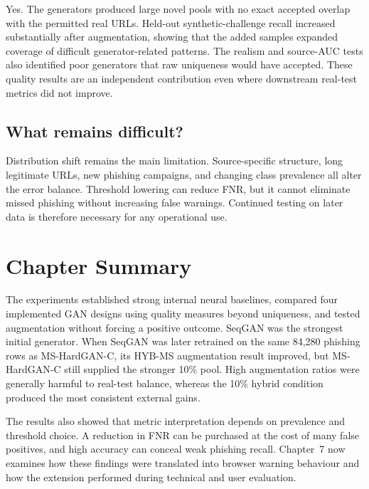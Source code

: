 Yes. The generators produced large novel pools with no exact accepted overlap
with the permitted real URLs. Held-out synthetic-challenge recall increased
substantially after augmentation, showing that the added samples expanded
coverage of difficult generator-related patterns. The realism and source-AUC
tests also identified poor generators that raw uniqueness would have accepted.
These quality results are an independent contribution even where downstream
real-test metrics did not improve.

\subsection{What remains difficult?}

Distribution shift remains the main limitation. Source-specific structure,
long legitimate URLs, new phishing campaigns, and changing class prevalence
all alter the error balance. Threshold lowering can reduce FNR, but it cannot
eliminate missed phishing without increasing false warnings. Continued testing
on later data is therefore necessary for any operational use.

\section{Chapter Summary}

The experiments established strong internal neural baselines, compared four
implemented GAN designs using quality measures beyond uniqueness, and tested
augmentation without forcing a positive outcome. SeqGAN was the strongest
initial generator. When SeqGAN was later retrained on the same 84,280 phishing
rows as MS-HardGAN-C, its HYB-MS augmentation result improved, but
MS-HardGAN-C still supplied the stronger 10\% pool. High augmentation ratios were generally harmful to real-test balance,
whereas the 10\% hybrid condition produced the most consistent external gains.

The results also showed that metric interpretation depends on prevalence and
threshold choice. A reduction in FNR can be purchased at the cost of many false
positives, and high accuracy can conceal weak phishing recall. Chapter~7 now
examines how these findings were translated into browser warning behaviour and
how the extension performed during technical and user evaluation.
